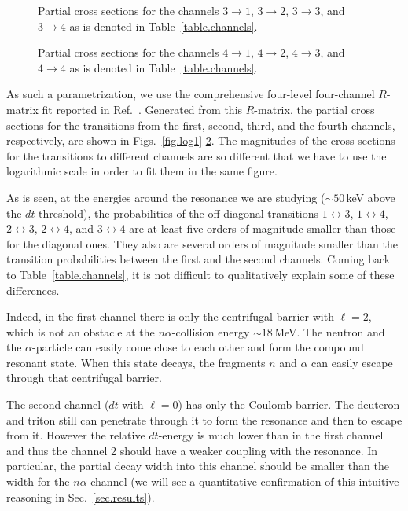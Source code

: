 \documentclass[12pt]{article}
\begin{document}
\begin{figure}
\centerline{}
\caption{\sf
Partial cross sections for the channels $3\to1$, $3\to2$, $3\to3$, and $3\to4$
as is denoted in Table~\ref{table.channels}.
}
\label{fig.log3}
\end{figure}

\begin{figure}
\centerline{}
\caption{\sf
Partial cross sections for the channels $4\to1$, $4\to2$, $4\to3$, and $4\to4$
as is denoted in Table~\ref{table.channels}.
}
\label{fig.log4}
\end{figure}

As such a parametrization, we use the comprehensive four-level four-channel
$R$-matrix fit reported in Ref.~\cite{PRL59}. Generated from this $R$-matrix,
the partial cross sections for the transitions from the first, second, third,
and the fourth channels, respectively, are shown in
Figs.~\ref{fig.log1}-\ref{fig.log4}.  The magnitudes of the cross
sections for the transitions to different channels are so different that we
have to use the logarithmic scale in order to fit them in the same figure.

As is seen, at the energies around the resonance we are studying
($\sim50$\,keV above the $dt$-threshold), the probabilities of the off-diagonal
transitions
$1\leftrightarrow3$, $1\leftrightarrow4$, $2\leftrightarrow3$,
$2\leftrightarrow4$, and $3\leftrightarrow4$ are at least five orders of
magnitude smaller than those for the diagonal ones. They also are several
orders of magnitude smaller than the transition
probabilities between the first and the second channels. Coming back to
Table~\ref{table.channels}, it is not difficult to qualitatively explain some of
these differences.

Indeed, in the first channel
there is only the centrifugal barrier with $\ell=2$, which is not an obstacle
at the $n\alpha$-collision energy $\sim18$\,MeV. The neutron and the
$\alpha$-particle
can easily come close to each other and form the compound resonant state. When
this state decays, the fragments $n$ and $\alpha$ can easily escape through
that centrifugal barrier.

The second channel ($dt$ with $\ell=0$) has only the Coulomb barrier. The
deuteron and triton still can penetrate through it to form the resonance and
then to escape from it. However the relative $dt$-energy is much lower than in
the first channel and thus the channel 2 should have a weaker coupling with the
resonance. In particular, the partial decay width into this channel should be
smaller than the width for the $n\alpha$-channel (we will see a quantitative
confirmation of this intuitive reasoning in Sec.~\ref{sec.results}).
\end{document}
